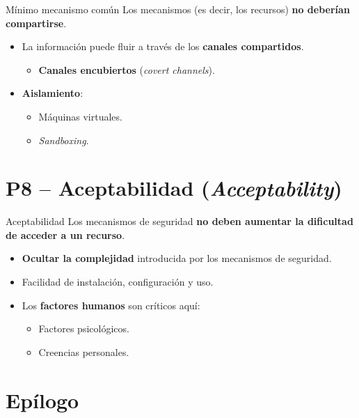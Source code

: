 \documentclass[11pt,a4paper]{report}
\begin{document}
\begin{definicion}{Mínimo mecanismo común}
Los mecanismos (es decir, los recursos) \textbf{no deberían compartirse}.
\end{definicion}
\begin{itemize}
  \item La información puede fluir a través de los \textbf{canales compartidos}.
    \begin{itemize}
      \item \textbf{Canales encubiertos} (\emph{covert channels}).
    \end{itemize}
  \item \textbf{Aislamiento}:
    \begin{itemize}
      \item Máquinas virtuales.
      \item \emph{Sandboxing}.
    \end{itemize}
\end{itemize}

\section{P8 -- Aceptabilidad (\emph{Acceptability})}

\begin{definicion}{Aceptabilidad}
Los mecanismos de seguridad \textbf{no deben aumentar la dificultad de acceder a un recurso}.
\end{definicion}
\begin{itemize}
  \item \textbf{Ocultar la complejidad} introducida por los mecanismos de seguridad.
  \item Facilidad de instalación, configuración y uso.
  \item Los \textbf{factores humanos} son críticos aquí:
    \begin{itemize}
      \item Factores psicológicos.
      \item Creencias personales.
    \end{itemize}
\end{itemize}

\section{Epílogo}
\end{document}
